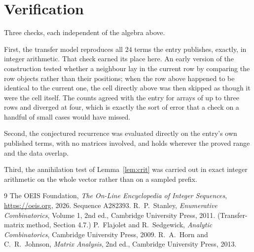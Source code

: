 \documentclass[11pt,a4paper]{article}
\theoremstyle{plain}
\theoremstyle{definition}
\begin{document}
\section{Verification}

Three checks, each independent of the algebra above.

First, the transfer model reproduces all $24$ terms the entry publishes, exactly, in
integer arithmetic. That check earned its place here. An early version of the construction
tested whether a neighbour lay in the current row by comparing the row objects rather
than their positions; when the row above happened to be identical to the current one, the
cell directly above was then skipped as though it were the cell itself. The counts agreed with
the entry for arrays of up to three rows and diverged at four, which is exactly the sort of
error that a check on a handful of small cases would have missed.

Second, the conjectured recurrence was evaluated directly on the entry's own published terms,
with no matrices involved, and holds wherever the proved range and the data overlap.

Third, the annihilation test of Lemma~\ref{lem:crit} was carried out in exact integer
arithmetic on the whole vector rather than on a sampled prefix.

\begin{thebibliography}{9}
 The OEIS Foundation, \emph{The On-Line Encyclopedia of Integer
Sequences}, \url{https://oeis.org}, 2026. Sequence A282393.
 R.~P.~Stanley, \emph{Enumerative Combinatorics}, Volume 1, 2nd ed.,
Cambridge University Press, 2011. (Transfer-matrix method, Section 4.7.)
 P.~Flajolet and R.~Sedgewick, \emph{Analytic Combinatorics}, Cambridge
University Press, 2009.
 R.~A.~Horn and C.~R.~Johnson, \emph{Matrix Analysis}, 2nd ed., Cambridge
University Press, 2013.
\end{thebibliography}
\end{document}
